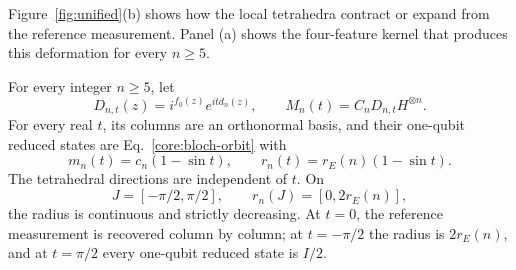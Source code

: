 Figure~\ref{fig:unified}(b) shows how the local tetrahedra contract or expand from the reference measurement. Panel (a) shows the four-feature kernel that produces this deformation for every $n\ge5$.

\begin{theorem}
\label{core:unified-theorem}
For every integer $n\ge5$, let
\begin{equation}
 D_{n,t}(z)=i^{f_0(z)}e^{itd_n(z)},\qquad
 M_n(t)=C_nD_{n,t}H^{\otimes n}.
 \label{core:unified-measurement}
\end{equation}
For every real $t$, its columns are an orthonormal basis, and their one-qubit reduced states are Eq.~\eqref{core:bloch-orbit} with
\begin{equation}
 m_n(t)=c_n(1-\sin t),\qquad
 r_n(t)=r_E(n)(1-\sin t).
 \label{core:radius}
\end{equation}
The tetrahedral directions are independent of $t$. On
\begin{equation}
 J=[-\pi/2,\pi/2],\qquad r_n(J)=[0,2r_E(n)],
 \label{core:interval}
\end{equation}
the radius is continuous and strictly decreasing. At $t=0$, the reference measurement is recovered column by column; at $t=-\pi/2$ the radius is $2r_E(n)$, and at $t=\pi/2$ every one-qubit reduced state is $I/2$.
\end{theorem}

